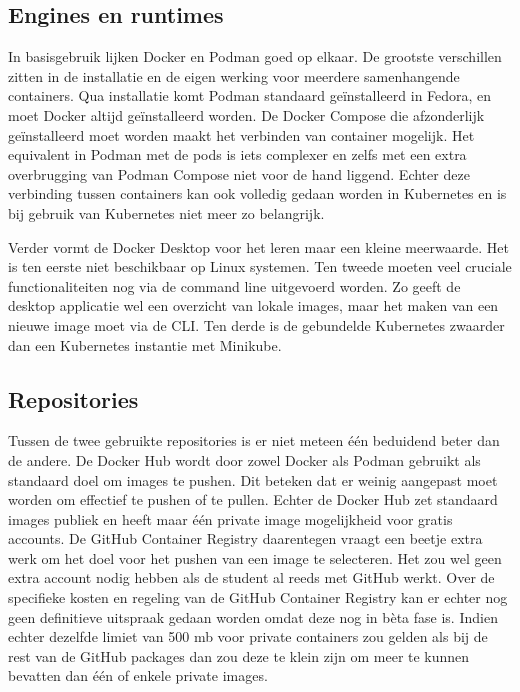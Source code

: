 \subsection{Engines en runtimes}

In basisgebruik lijken Docker en Podman goed op elkaar. De grootste verschillen zitten in de installatie en de eigen werking voor meerdere samenhangende containers. Qua installatie komt Podman standaard geïnstalleerd in Fedora, en moet Docker altijd geïnstalleerd worden. De Docker Compose die afzonderlijk geïnstalleerd moet worden maakt het verbinden van container mogelijk. Het equivalent in Podman met de pods is iets complexer en zelfs met een extra overbrugging van Podman Compose niet voor de hand liggend. Echter deze verbinding tussen containers kan ook volledig gedaan worden in Kubernetes en is bij gebruik van Kubernetes niet meer zo belangrijk.

Verder vormt de Docker Desktop voor het leren maar een kleine meerwaarde. Het is ten eerste niet beschikbaar op Linux systemen. Ten tweede moeten veel cruciale functionaliteiten nog via de command line uitgevoerd worden. Zo geeft de desktop applicatie wel een overzicht van lokale images, maar het maken van een nieuwe image moet via de CLI. Ten derde is de gebundelde Kubernetes zwaarder dan een Kubernetes instantie met Minikube.

\subsection{Repositories}

Tussen de twee gebruikte repositories is er niet meteen één beduidend beter dan de andere. De Docker Hub wordt door zowel Docker als Podman gebruikt als standaard doel om images te pushen. Dit beteken dat er weinig aangepast moet worden om effectief te pushen of te pullen. Echter de Docker Hub zet standaard images publiek en heeft maar één private image mogelijkheid voor gratis accounts. De GitHub Container Registry daarentegen vraagt een beetje extra werk om het doel voor het pushen van een image te selecteren. Het zou wel geen extra account nodig hebben als de student al reeds met GitHub werkt. Over de specifieke kosten en regeling van de GitHub Container Registry kan er echter nog geen definitieve uitspraak gedaan worden omdat deze nog in bèta fase is. Indien echter dezelfde limiet van 500 mb voor private containers zou gelden als bij de rest van de GitHub packages dan zou deze te klein zijn om meer te kunnen bevatten dan één of enkele private images.

